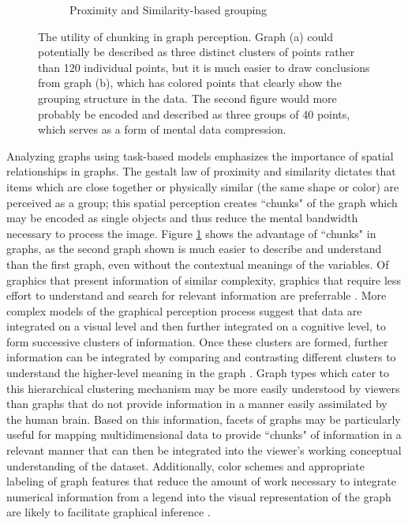 \documentclass[11pt]{isuthesis}\usepackage[]{graphicx}\usepackage[]{color}
\begin{document}
\begin{figure}[htbp]
\begin{subfigure}[b]{.45\textwidth}
  \caption{Proximity and Similarity-based grouping}
\end{subfigure}\hfill
\caption[Chunking in Graphs]{The utility of chunking in graph perception. Graph (a) could potentially be described as three distinct clusters of points rather than 120 individual points, but it is much easier to draw conclusions from graph (b), which has colored points that clearly show the grouping structure in the data. The second figure would more probably be encoded and described as three groups of 40 points, which serves as a form of mental data compression.}\label{fig:clustering}
\end{figure}

Analyzing graphs using task-based models emphasizes the importance of spatial relationships in graphs. The gestalt law of proximity and similarity dictates that items which are close together or physically similar (the same shape or color) are perceived as a group; this spatial perception creates ``chunks" of the graph which may be encoded as single objects and thus reduce the mental bandwidth necessary to process the image. Figure \ref{fig:clustering} shows the advantage of ``chunks" in graphs, as the second graph shown is much easier to describe and understand than the first graph, even without the contextual meanings of the variables. Of graphics that present information of similar complexity, graphics that require less effort to understand and search for relevant information are preferrable \citep{cleveland:1985}. More complex models of the graphical perception process suggest that data are integrated on a visual level and then further integrated on a cognitive level, to form successive clusters of information. Once these clusters are formed, further information can be integrated by comparing and contrasting different clusters to understand the higher-level meaning in the graph \citep{ratwani2008thinking}. Graph types which cater to this hierarchical clustering mechanism may be more easily understood by viewers than graphs that do not provide information in a manner easily assimilated by the human brain. Based on this information, facets of graphs may be particularly useful for mapping multidimensional data to provide ``chunks" of information in a relevant manner that can then be integrated into the viewer's working conceptual understanding of the dataset. Additionally, color schemes and appropriate labeling of graph features that reduce the amount of work necessary to integrate numerical information from a legend into the visual representation of the graph are likely to facilitate graphical inference \citep{carpenter1998model}.
\end{document}
